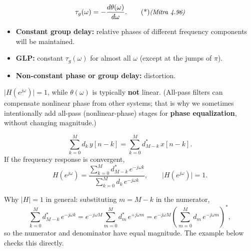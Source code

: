 \documentclass[handout_subfiles_root.tex]{subfiles}
\begin{document}
\begin{defbox}[title={Group Delay}]
\begin{equation*}
\tau_g(\omega) = -\frac{d\theta(\omega)}{d\omega}. \MitraTag{4.96}
\end{equation*}
\end{defbox}

\begin{itemize}
  \item \textbf{Constant group delay:} relative phases of different frequency components will be maintained.
  \item \textbf{GLP:} constant $\tau_g(\omega)$ for almost all $\omega$ (except at the jumps of $\pi$).
  \item \textbf{Non-constant phase or group delay:} distortion.\footnotemark{}
\end{itemize}


\begin{defbox}[title={All-Pass Filter}]
$\big|H(e^{j\omega})\big| = 1$, while $\theta(\omega)$ is typically \textbf{not} linear.
(All-pass filters can compensate nonlinear phase from other systems; that is why we sometimes intentionally add all-pass (nonlinear-phase) stages for \textbf{phase equalization}, without changing magnitude.)
\end{defbox}

\begin{examplebox}[title={Example (LDE)}]
\begin{equation*}
\sum_{k=0}^{M} d_k\,y[n-k] = \sum_{k=0}^{M} d^*_{M-k}\,x[n-k].
\end{equation*}
If the frequency response is convergent,
\begin{equation*}
H(e^{j\omega}) = \frac{\displaystyle\sum_{k=0}^{M} d^*_{M-k}\,e^{-j\omega k}}{\displaystyle\sum_{k=0}^{M} d_k\,e^{-j\omega k}},
\qquad \big|H(e^{j\omega})\big| = 1.
\end{equation*}
\end{examplebox}

\begin{notebox}[title=\HandoutNoteAddendumTitle]
Why $|H|=1$ in general: substituting $m = M-k$ in the numerator,
\begin{equation*}
\sum_{k=0}^{M} d^*_{M-k}\,e^{-j\omega k} = e^{-j\omega M}\sum_{m=0}^{M} d^*_m\,e^{+j\omega m}
= e^{-j\omega M}\left(\sum_{m=0}^{M} d_m\,e^{-j\omega m}\right)^{\!*},
\end{equation*}
so the numerator and denominator have equal magnitude. The example below checks this directly.
\end{notebox}
\end{document}
